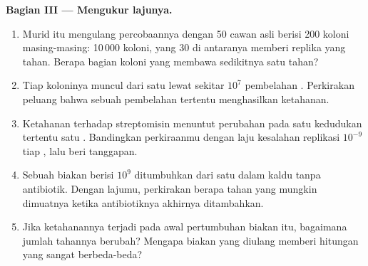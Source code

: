 \begin{problem}
\medskip
\noindent\textbf{Bagian III --- Mengukur lajunya.}
\begin{enumerate}[resume]
  \item Murid itu mengulang percobaannya dengan 50 cawan asli berisi
        200 koloni masing-masing: 10\,000 koloni, yang 30 di antaranya
        memberi replika yang tahan. Berapa bagian koloni yang membawa
        sedikitnya satu  tahan?
  \item Tiap koloninya muncul dari satu  lewat sekitar $10^7$
        pembelahan . Perkirakan peluang bahwa sebuah pembelahan
        tertentu menghasilkan  ketahanan.
  \item Ketahanan terhadap streptomisin menuntut perubahan pada satu
        kedudukan tertentu satu . Bandingkan perkiraanmu dengan laju
        kesalahan replikasi $10^{-9}$ tiap , lalu beri tanggapan.
  \item Sebuah biakan berisi $10^9$  ditumbuhkan dari satu  dalam
        kaldu tanpa antibiotik. Dengan lajumu, perkirakan berapa 
        tahan yang mungkin dimuatnya ketika antibiotiknya akhirnya
        ditambahkan.
  \item Jika  ketahanannya terjadi pada awal pertumbuhan biakan
        itu, bagaimana jumlah  tahannya berubah? Mengapa biakan yang
        diulang memberi hitungan yang sangat berbeda-beda?
\end{enumerate}


\end{problem}
